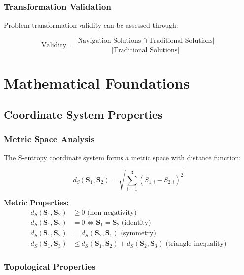 \documentclass[11pt]{article}
\begin{document}
\subsubsection{Transformation Validation}

Problem transformation validity can be assessed through:

\begin{equation}
\text{Validity} = \frac{|\text{Navigation Solutions} \cap \text{Traditional Solutions}|}{|\text{Traditional Solutions}|}
\label{eq:transformation_validity}
\end{equation}

\section{Mathematical Foundations}

\subsection{Coordinate System Properties}

\subsubsection{Metric Space Analysis}

The S-entropy coordinate system forms a metric space with distance function:

\begin{equation}
d_S(\mathbf{S}_1, \mathbf{S}_2) = \sqrt{\sum_{i=1}^{3} (S_{1,i} - S_{2,i})^2}
\label{eq:s_entropy_metric}
\end{equation}

\textbf{Metric Properties:}
\begin{align}
d_S(\mathbf{S}_1, \mathbf{S}_2) &\geq 0 \text{ (non-negativity)} \\
d_S(\mathbf{S}_1, \mathbf{S}_2) &= 0 \iff \mathbf{S}_1 = \mathbf{S}_2 \text{ (identity)} \\
d_S(\mathbf{S}_1, \mathbf{S}_2) &= d_S(\mathbf{S}_2, \mathbf{S}_1) \text{ (symmetry)} \\
d_S(\mathbf{S}_1, \mathbf{S}_3) &\leq d_S(\mathbf{S}_1, \mathbf{S}_2) + d_S(\mathbf{S}_2, \mathbf{S}_3) \text{ (triangle inequality)}
\end{align}

\subsubsection{Topological Properties}
\end{document}

